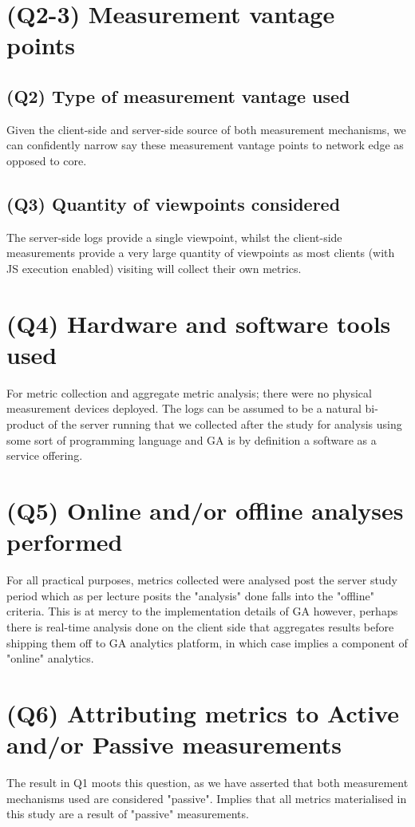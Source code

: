 \documentclass{article}
\begin{document}
\section*{(Q2-3) Measurement vantage points}
\subsection*{(Q2) Type of measurement vantage used}
Given the client-side and server-side source of both measurement mechanisms, we can confidently narrow say these measurement vantage points to network edge as opposed to core.

\subsection*{(Q3) Quantity of viewpoints considered}
The server-side logs provide a single viewpoint, whilst the client-side measurements provide a very large quantity of viewpoints as most clients (with JS execution enabled) visiting will collect their own metrics.

\section*{(Q4) Hardware and software tools used}
For metric collection and aggregate metric analysis; there were no physical measurement devices deployed. The logs can be assumed to be a natural bi-product of the server running that we collected after the study for analysis using some sort of programming language and GA is by definition a software as a service offering.
 

\section*{(Q5) Online and/or offline analyses performed}
For all practical purposes, metrics collected were analysed post the server study period which as per lecture posits the "analysis" done falls into the "offline" criteria. This is at mercy to the implementation details of GA however, perhaps there is real-time analysis done on the client side that aggregates results before shipping them off to GA analytics platform, in which case implies a component of "online" analytics.

\section*{(Q6) Attributing metrics to Active and/or Passive measurements}
The result in Q1 moots this question, as we have asserted that both measurement mechanisms used are considered "passive". Implies that all metrics materialised in this study are a result of "passive" measurements.
\end{document}
